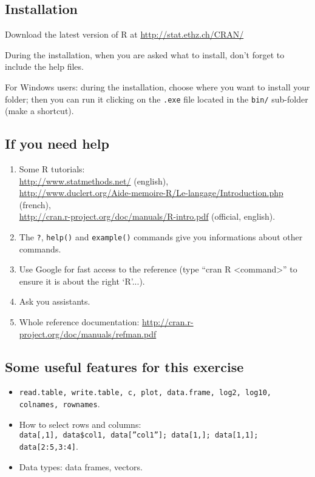 \documentclass[a4paper,11pt]{article}
\begin{document}
\subsection{Installation}
Download the latest version of R at \url{http://stat.ethz.ch/CRAN/}

During the installation, when you are asked what to install, don't forget to include the help files.

For Windows users: during the installation, choose where you want to install your folder; then you can run it clicking on the \texttt{.exe} file located in the \texttt{bin/} sub-folder (make a shortcut).

\subsection{If you need help}
\begin{enumerate}
\item Some R tutorials: \\
      \url{http://www.statmethods.net/} (english),\\
      \url{http://www.duclert.org/Aide-memoire-R/Le-langage/Introduction.php} (french), \\
      \url{http://cran.r-project.org/doc/manuals/R-intro.pdf} (official, english).
\item The \texttt{?}, \texttt{help()} and \texttt{example()} commands give you informations about other commands.
\item Use Google for fast access to the reference (type ``cran R <command>'' to ensure it is about the right `R'...).
\item Ask you assistants.
\item Whole reference documentation: \url{http://cran.r-project.org/doc/manuals/refman.pdf}
\end{enumerate}

\subsection{Some useful features for this exercise}
\begin{itemize}
\item \texttt{read.table, write.table, c, plot, data.frame, log2, log10, colnames, rownames}.
\item How to select rows and columns:\\ \texttt{data[,1], data\$col1, data[''col1'']; data[1,]; data[1,1]; data[2:5,3:4]}.
\item Data types: data frames, vectors.
\end{itemize}
\end{document}
